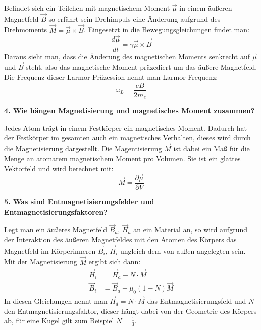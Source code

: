 \begin{addmargin}[25pt]{0pt}
Befindet sich ein Teilchen mit magnetischem Moment $\vec{\mu}$ in einem äußeren Magnetfeld $\Vec{B}$ so erfährt sein Drehimpuls eine Änderung aufgrund des Drehmoments $\Vec{M} = \Vec{\mu} \times \Vec{B}$. Eingesetzt in die Bewegungsgleichungen findet man: 
\begin{equation}\label{eq:Bewegungsgleichung_Larmor}
    \frac{\si{d}\vec{\mu}}{\si{d}t} = \gamma \Vec{\mu} \times \Vec{B}
\end{equation}
Daraus sieht man, dass die Änderung des magnetischen Moments senkrecht auf $\Vec{\mu}$ und $\Vec{B}$ steht, also das magnetische Moment präzediert um das äußere Magnetfeld. Die Frequenz dieser Larmor-Präzession nennt man Larmor-Frequenz:
\begin{equation}\label{eq:Larmor_Frequenz}
    \omega_L = \frac{eB}{2m_e}
\end{equation}
\end{addmargin}

\noindent\textbf{4. Wie hängen Magnetisierung und magnetisches Moment zusammen?}\\
\begin{addmargin}[25pt]{0pt}
Jedes Atom trägt in einem Festkörper ein magnetisches Moment. Dadurch hat der Festkörper im gesamten auch ein magnetisches Verhalten, dieses wird durch die Magnetisierung dargestellt. Die Magentisierung $\Vec{M}$ ist dabei ein Maß für die Menge an atomarem magnetischem Moment pro Volumen. Sie ist ein glattes Vektorfeld und wird berechnet mit:
\begin{equation}\label{eq:Definition_Magnetisierung}
    \Vec{M} = \frac{\partial \Vec{\mu}}{\partial V}
\end{equation}

\end{addmargin}

\noindent\textbf{5. Was sind Entmagnetisierungsfelder und Entmagnetisierungsfaktoren?}\\
\begin{addmargin}[25pt]{0pt}
Legt man ein äußeres Magnetfeld $\vec{B}_a$, $\Vec{H}_a$ an ein Material an, so wird aufgrund der Interaktion des äußeren Magnetfeldes mit den Atomen des Körpers das Magnetfeld im Körperinneren $\vec{B}_i$, $\Vec{H}_i$ ungleich dem von außen angelegten sein. Mit der Magnetisierung $\Vec{M}$ ergibt sich dann:
\begin{align}
    \Vec{H}_i &= \Vec{H}_a - N\cdot\Vec{M}\\
    \Vec{B}_i &= \Vec{B}_a + \mu_0 (1-N)\Vec{M}
\end{align}
In diesen Gleichungen nennt man $\Vec{H}_d = N\cdot\Vec{M}$ das Entmagnetisierungsfeld und $N$ den Entmagnetisierungsfaktor, dieser hängt dabei von der Geometrie des Körpers ab, für eine Kugel gilt zum Beispiel $N = \frac{1}{3}$.\\ 
\end{addmargin}

